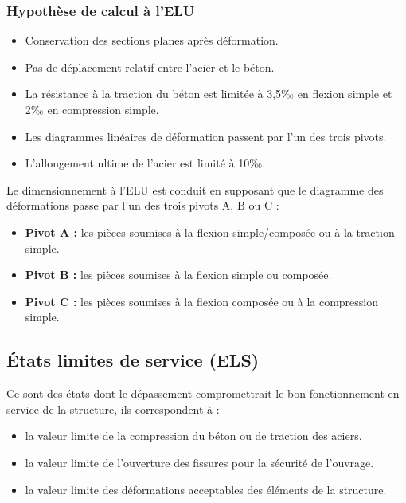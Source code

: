\documentclass[12pt,a4paper]{report}
\numberwithin{equation}{section}
\begin{document}
	\subsubsection{Hypothèse de calcul à l'ELU}
	
	\begin{itemize}
		\item Conservation des sections planes après déformation.	
		\item Pas de déplacement relatif entre l'acier et le béton.
		\item La résistance à la traction du béton est limitée à 3,5‰ en flexion simple et 2‰ en
		compression simple.
		\item Les diagrammes linéaires de déformation passent par l'un des trois pivots.
		\item L'allongement ultime de l'acier est limité à 10‰.
	\end{itemize}
	
	
	Le dimensionnement à l'ELU est conduit en supposant que le diagramme des déformations
	passe par l'un des trois pivots A, B ou C :
	
	\begin{itemize}
		\item \textbf{Pivot A :} les pièces soumises à la flexion simple/composée ou à la traction simple.
		\item \textbf{Pivot B :} les pièces soumises à la flexion simple ou composée.
		\item \textbf{Pivot C :} les pièces soumises à la flexion composée ou à la compression simple.
	\end{itemize}
	
	
	\subsection{États limites de service (ELS)}

	Ce sont des états dont le dépassement compromettrait
	le bon fonctionnement en service de la structure, ils correspondent à :
	
	\begin{itemize}
		\item la valeur limite de la compression du béton ou de traction des aciers.
		\item la valeur limite de l'ouverture des fissures pour la sécurité de l’ouvrage.
		\item la valeur limite des déformations acceptables des éléments de la structure.
	\end{itemize}
\end{document}
